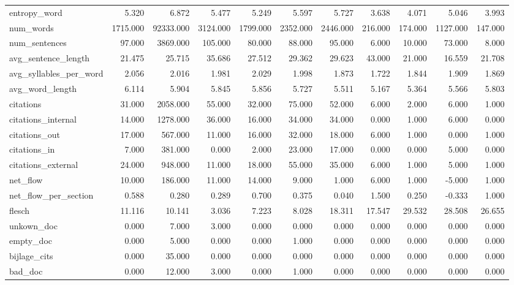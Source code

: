 \begin{tabular}{lrrrrrrrrrr}
\cline{1-11}
entropy\_word & 5.320 & 6.872 & 5.477 & 5.249 & 5.597 & 5.727 & 3.638 & 4.071 & 5.046 & 3.993 \\
\cline{1-11}
num\_words & 1715.000 & 92333.000 & 3124.000 & 1799.000 & 2352.000 & 2446.000 & 216.000 & 174.000 & 1127.000 & 147.000 \\
\cline{1-11}
num\_sentences & 97.000 & 3869.000 & 105.000 & 80.000 & 88.000 & 95.000 & 6.000 & 10.000 & 73.000 & 8.000 \\
\cline{1-11}
avg\_sentence\_length & 21.475 & 25.715 & 35.686 & 27.512 & 29.362 & 29.623 & 43.000 & 21.000 & 16.559 & 21.708 \\
\cline{1-11}
avg\_syllables\_per\_word & 2.056 & 2.016 & 1.981 & 2.029 & 1.998 & 1.873 & 1.722 & 1.844 & 1.909 & 1.869 \\
\cline{1-11}
avg\_word\_length & 6.114 & 5.904 & 5.845 & 5.856 & 5.727 & 5.511 & 5.167 & 5.364 & 5.566 & 5.803 \\
\cline{1-11}
citations & 31.000 & 2058.000 & 55.000 & 32.000 & 75.000 & 52.000 & 6.000 & 2.000 & 6.000 & 1.000 \\
\cline{1-11}
citations\_internal & 14.000 & 1278.000 & 36.000 & 16.000 & 34.000 & 34.000 & 0.000 & 1.000 & 6.000 & 0.000 \\
\cline{1-11}
citations\_out & 17.000 & 567.000 & 11.000 & 16.000 & 32.000 & 18.000 & 6.000 & 1.000 & 0.000 & 1.000 \\
\cline{1-11}
citations\_in & 7.000 & 381.000 & 0.000 & 2.000 & 23.000 & 17.000 & 0.000 & 0.000 & 5.000 & 0.000 \\
\cline{1-11}
citations\_external & 24.000 & 948.000 & 11.000 & 18.000 & 55.000 & 35.000 & 6.000 & 1.000 & 5.000 & 1.000 \\
\cline{1-11}
net\_flow & 10.000 & 186.000 & 11.000 & 14.000 & 9.000 & 1.000 & 6.000 & 1.000 & -5.000 & 1.000 \\
\cline{1-11}
net\_flow\_per\_section & 0.588 & 0.280 & 0.289 & 0.700 & 0.375 & 0.040 & 1.500 & 0.250 & -0.333 & 1.000 \\
\cline{1-11}
flesch & 11.116 & 10.141 & 3.036 & 7.223 & 8.028 & 18.311 & 17.547 & 29.532 & 28.508 & 26.655 \\
\cline{1-11}
unkown\_doc & 0.000 & 7.000 & 3.000 & 0.000 & 0.000 & 0.000 & 0.000 & 0.000 & 0.000 & 0.000 \\
\cline{1-11}
empty\_doc & 0.000 & 5.000 & 0.000 & 0.000 & 1.000 & 0.000 & 0.000 & 0.000 & 0.000 & 0.000 \\
\cline{1-11}
bijlage\_cits & 0.000 & 35.000 & 0.000 & 0.000 & 0.000 & 0.000 & 0.000 & 0.000 & 0.000 & 0.000 \\
\cline{1-11}
bad\_doc & 0.000 & 12.000 & 3.000 & 0.000 & 1.000 & 0.000 & 0.000 & 0.000 & 0.000 & 0.000 \\
\cline{1-11}
\bottomrule
\end{tabular}
